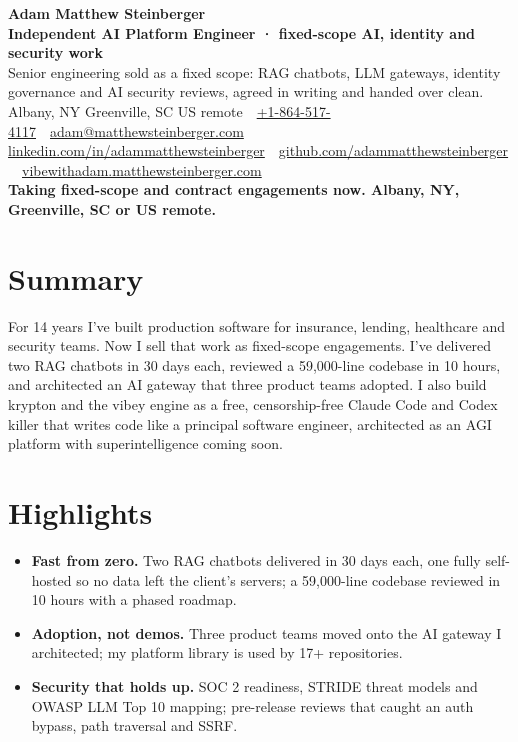 \documentclass[10pt,letterpaper]{article}
\newcommand{\szname}{\fontsize{20pt}{24pt}\selectfont}
\newcommand{\sztitle}{\fontsize{10.5pt}{13pt}\selectfont}
\newcommand{\szbody}{\fontsize{9pt}{10.8pt}\selectfont}
\newcommand{\szmeta}{\fontsize{8pt}{10pt}\selectfont}
\begin{document}
\color{ink}\szbody

\begin{center}
{\szname\bfseries\color{primary} Adam Matthew Steinberger}\\[3pt]
{\sztitle\bfseries\color{accent} Independent AI Platform Engineer · fixed-scope AI, identity and security work}\\[4pt]
{\szbody Senior engineering sold as a fixed scope: RAG chatbots, LLM gateways, identity governance and AI security reviews, agreed in writing and handed over clean.}\\[6pt]
{\szmeta\color{muted} Albany, NY \textbullet{} Greenville, SC \textbullet{} US remote\ {\color{rulecolor}\textbar}\ \href{tel:+18645174117}{+1-864-517-4117}\ {\color{rulecolor}\textbar}\ \href{mailto:adam@matthewsteinberger.com}{adam@matthewsteinberger.com}}\\[2pt]
{\szmeta\color{muted} \href{https://www.linkedin.com/in/adammatthewsteinberger/}{linkedin.com/in/adammatthewsteinberger}\ {\color{rulecolor}\textbar}\ \href{https://github.com/adammatthewsteinberger}{github.com/adammatthewsteinberger}\ {\color{rulecolor}\textbar}\ \href{https://vibewithadam.matthewsteinberger.com}{vibewithadam.matthewsteinberger.com}}\\[6pt]
{\szbody\bfseries Taking fixed-scope and contract engagements now. Albany, NY, Greenville, SC or US remote.}
\end{center}
\vspace{-6pt}
\section*{Summary}
For 14 years I've built production software for insurance, lending, healthcare and security teams. Now I sell that work as fixed-scope engagements. I've delivered two RAG chatbots in 30 days each, reviewed a 59,000-line codebase in 10 hours, and architected an AI gateway that three product teams adopted. I also build krypton and the vibey engine as a free, censorship-free Claude Code and Codex killer that writes code like a principal software engineer, architected as an AGI platform with superintelligence coming soon.\par
\section*{Highlights}
\begin{itemize}
\item \textbf{Fast from zero.} Two RAG chatbots delivered in 30 days each, one fully self-hosted so no data left the client's servers; a 59,000-line codebase reviewed in 10 hours with a phased roadmap.
\item \textbf{Adoption, not demos.} Three product teams moved onto the AI gateway I architected; my platform library is used by 17+ repositories.
\item \textbf{Security that holds up.} SOC 2 readiness, STRIDE threat models and OWASP LLM Top 10 mapping; pre-release reviews that caught an auth bypass, path traversal and SSRF.
\end{itemize}
\end{document}
